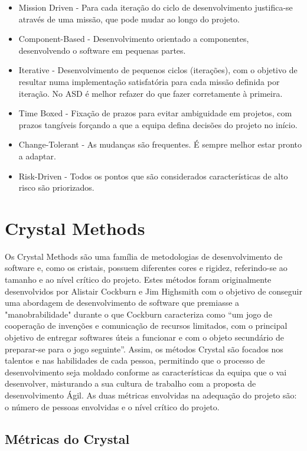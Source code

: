 \begin{itemize}
    \item Mission Driven - Para cada iteração do ciclo de desenvolvimento justifica-se através de uma missão, que pode mudar ao longo do projeto.
    \item Component-Based - Desenvolvimento orientado a componentes, desenvolvendo o software em pequenas partes.
    \item Iterative - Desenvolvimento de pequenos ciclos (iterações), com o objetivo de resultar numa implementação satisfatória para cada missão definida por iteração. No ASD é melhor refazer do que fazer corretamente à primeira.
    \item Time Boxed - Fixação de prazos para evitar ambiguidade em projetos, com prazos tangíveis forçando a que a equipa defina decisões do projeto no início.
    \item Change-Tolerant - As mudanças são frequentes. É sempre melhor estar pronto a adaptar.
    \item Risk-Driven - Todos os pontos que são considerados características de alto risco são priorizados.
\end{itemize}

\newpage

\section{Crystal Methods}

Os Crystal Methods são uma família de metodologias de desenvolvimento de software e, como os cristais, possuem diferentes cores e rigidez, referindo-se ao tamanho e ao nível crítico do projeto.
Estes métodos foram originalmente desenvolvidos por Alistair Cockburn e Jim Highsmith com o objetivo de conseguir uma abordagem de desenvolvimento de software que premiasse a "manobrabilidade" durante o que Cockburn caracteriza como “um jogo de cooperação de invenções e comunicação de recursos limitados, com o principal objetivo de entregar softwares úteis a funcionar e com o objeto secundário de preparar-se para o jogo seguinte”.
Assim, os métodos Crystal são focados nos talentos e nas habilidades de cada pessoa, permitindo que o processo de desenvolvimento seja moldado conforme as características da equipa que o vai desenvolver, misturando a sua cultura de trabalho com a proposta de desenvolvimento Ágil.
As duas métricas envolvidas na adequação do projeto são: o número de pessoas envolvidas e o nível crítico do projeto.

\subsection{Métricas do Crystal}

